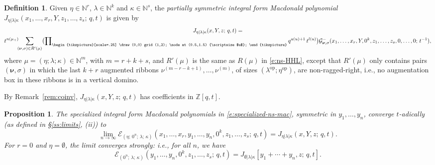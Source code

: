 \documentclass[12pt]{amsart}
\newtheorem{prop}[thm]{Proposition}
\theoremstyle{definition}
\newtheorem{defn}[thm]{Definition}
\theoremstyle{remark}
\newcommand{\NN}{{\mathbb N}}
\newcommand{\ZZ}{{\mathbb Z}}
\newcommand{\nubold}{{\boldsymbol \nu }}
\newcommand{\Ecal}{{\mathcal E}}
\newcommand{\Gcal}{{\mathcal G}}
\newcommand{\domino}{\begin{tikzpicture}[scale=.25]
\draw (0,0) grid (1,2);
\node at (0.5,1.5) {\scriptsize $u$};
\end{tikzpicture}}
\DeclareMathOperator{\op}{op}
\newcommand{\Jns}{J}           %
\begin{document}
\begin{defn}\label{def:symm-int-form}
Given $\eta \in \NN ^{r}$, $\lambda \in \NN ^{k}$ and $\kappa \in \NN
^{s}$, the {\em partially symmetric integral form Macdonald
polynomial} $\Jns _{\eta |\lambda |\kappa
}(x_{1},\ldots,x_{r},Y,z_{1},\ldots,z_{s};\, q,t)$ is given by
\begin{multline}\label{e:J-eta-lambda-kappa}
\Jns _{\eta |\lambda |\kappa }(x,Y,z;\, q,t) = \\
t^{n(\mu _{+})}\hspace{-1ex} \sum _{(\nubold ,\sigma )\in R'(\mu )}
\bigl( \prod \nolimits_{\domino } q^{a(u)+1}\, t^{l(u)} \bigr) \Gcal
_{\nubold ,\sigma }^{-}(x_{1}, \ldots, x_{r}, Y, 0^{k}, z_{1}, \ldots,
z_{s},0,\ldots,0;\, t^{-1}),
\end{multline}
where $\mu =(\eta ;\lambda ;\kappa )\in \NN ^{m}$, with $m=r+k+s$, and
$R'(\mu )$ is the same as $R(\mu )$ in \eqref{e:ns-HHL}, except that
$R'(\mu )$ only contains pairs $(\nubold ,\sigma )$ in which the last
$k+r$ augmented ribbons $\nu ^{(m-r-k+1)},\ldots,\nu ^{(m)}$, of sizes
$(\lambda ^{\op}; \eta ^{\op})$, are non-ragged-right, i.e., no
augmentation box in these ribbons is in a vertical domino.
\end{defn}

By Remark~\ref{rem:coinv}, $\Jns _{\eta |\lambda |\kappa }(x,Y,z;\,
q,t)$ has coefficients in $\ZZ [q,t]$.

\begin{prop}\label{prop:stable-insertion}
The specialized integral form Macdonald polynomials in
\eqref{e:specialized-ns-mac}, symmetric in $y_{1},\ldots,y_{n}$,
converge $t$-adically (as defined in \S \ref{ss:limits}, (ii)) to
\begin{equation}\label{e:stable-insertion}
\lim _{n\rightarrow \infty } \Ecal _{(\eta ;\, 0^{n};\, \lambda; \,
\kappa )}(x_{1},\ldots,x_{r},y_{1},\ldots,y_{n}, 0^{k}, z_{1}, \ldots,
z_{s}; \, q,t) = \Jns _{\eta |\lambda |\kappa }(x,Y,z;\, q,t).
\end{equation}
For $r=0$ and $\eta =\emptyset $, the limit converges strongly: i.e., for
all $n$, we have
\begin{equation}\label{e:strong-stable-insertion}
\Ecal _{(0^{n};\, \lambda ;\, \kappa )}(y_{1},\ldots,y_{n}, 0^{k},
z_{1}, \ldots, z_{s}; \, q,t) = \Jns _{\emptyset |\lambda |\kappa
}[y_{1}+\cdots +y_{n},z;\, q,t].
\end{equation}
\end{prop}
\end{document}
